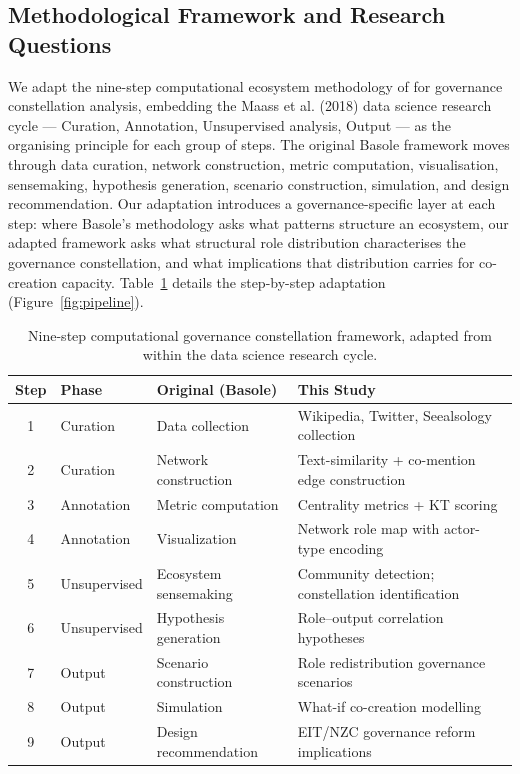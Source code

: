 \documentclass[review,12pt]{elsarticle}
\begin{document}
\subsection{Methodological Framework and Research Questions}

We adapt the nine-step computational ecosystem methodology of \citet{basole2023computational} for governance constellation analysis, embedding the Maass et al. (2018) data science research cycle --- Curation, Annotation, Unsupervised analysis, Output --- as the organising principle for each group of steps. The original Basole framework moves through data curation, network construction, metric computation, visualisation, sensemaking, hypothesis generation, scenario construction, simulation, and design recommendation. Our adaptation introduces a governance-specific layer at each step: where Basole's methodology asks what patterns structure an ecosystem, our adapted framework asks what structural role distribution characterises the governance constellation, and what implications that distribution carries for co-creation capacity. Table~\ref{tab:framework} details the step-by-step adaptation (Figure~\ref{fig:pipeline}).

\begin{table}[htbp]
\centering
\caption{Nine-step computational governance constellation framework, adapted from \citet{basole2023computational} within the \citet{maass2018data} data science research cycle.}
\label{tab:framework}
\small
\begin{tabular}{@{}clll@{}}
\toprule
\textbf{Step} & \textbf{Phase} & \textbf{Original (Basole)} & \textbf{This Study} \\
\midrule
1 & Curation & Data collection & Wikipedia, Twitter, Seealsology collection \\
2 & Curation & Network construction & Text-similarity + co-mention edge construction \\
3 & Annotation & Metric computation & Centrality metrics + KT scoring \\
4 & Annotation & Visualization & Network role map with actor-type encoding \\
5 & Unsupervised & Ecosystem sensemaking & Community detection; constellation identification \\
6 & Unsupervised & Hypothesis generation & Role--output correlation hypotheses \\
7 & Output & Scenario construction & Role redistribution governance scenarios \\
8 & Output & Simulation & What-if co-creation modelling \\
9 & Output & Design recommendation & EIT/NZC governance reform implications \\
\bottomrule
\end{tabular}
\end{table}
\end{document}
